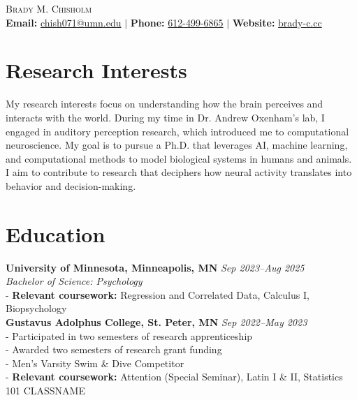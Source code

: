 \documentclass[12pt, a4paper]{article}
\begin{document}
\begin{center}
    {\Large \textsc{Brady M. Chisholm}} \\[0.3em] %
    \normalsize
    \textbf{Email:} \href{mailto:chish071@umn.edu}{chish071@umn.edu} \quad $|$ \quad
    \textbf{Phone:} \href{null}{612-499-6865} \quad $|$ \quad
    \textbf{Website:} \href{http://brady-c.cc}{brady-c.cc} \\
\end{center}

\vspace{-1.8em}

\section*{Research Interests}
My research interests focus on understanding how the brain perceives and interacts with the world. 
During my time in Dr. Andrew Oxenham's lab, I engaged in auditory perception research, which introduced 
me to computational neuroscience. My goal is to pursue a Ph.D. that leverages AI, machine learning, and 
computational methods to model biological systems in humans and animals. I aim to contribute to research 
that deciphers how neural activity translates into behavior and decision-making.\\
\vspace{-1.8em}
\section*{Education}
\textbf{University of Minnesota, Minneapolis, MN} \hfill \textit{Sep 2023--Aug 2025} \\
\textit{Bachelor of Science: Psychology} \\
- \textbf{Relevant coursework:} Regression and Correlated Data, Calculus I, Biopsychology\\
\textbf{Gustavus Adolphus College, St. Peter, MN} \hfill \textit{Sep 2022--May 2023} \\
- Participated in two semesters of research apprenticeship \\
- Awarded two semesters of research grant funding \\
- Men’s Varsity Swim \& Dive Competitor \\
- \textbf{Relevant coursework:} Attention (Special Seminar), Latin I \& II, Statistics 101 CLASSNAME\\
\vspace{-1.8em}
\end{document}
